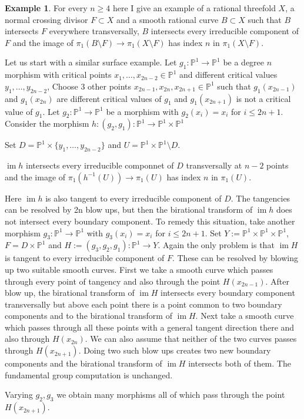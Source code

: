 \documentclass[12pt,twoside]{amsart}
\newcommand{\p}[0]{{\mathbb P}}
\newcommand{\im}[0]{\operatorname{im}}
\theoremstyle{definition}
\newtheorem{exmp}[thm]{Example}
\theoremstyle{remark}
\begin{document}
\begin{exmp} For every $n\geq 4$ here I give an example
 of a rational threefold $X$,
a normal crossing divisor $F\subset X$ and a smooth rational curve
$B\subset X$ such that $B$ intersects $F$ everywhere transversally,
$B$ intersects every irreducible component of $F$ and
the image of $\pi_1(B\setminus F)\to \pi_1(X\setminus F)$
has index $n$ in $\pi_1(X\setminus F)$.
 
Let us start with a similar surface example.
Let $g_1:\p^1\to \p^1$ be a degree $n$ morphism
with critical points $x_1,\dots,x_{2n-2}\in \p^1$ and different
 critical values $y_1,\dots,y_{2n-2}$,
 Choose 3 other points $x_{2n-1},x_{2n},x_{2n+1}\in \p^1$
 such that $g_1(x_{2n-1})$ and $g_1(x_{2n})$ are different critical
 values of $g_1$
 and $g_1(x_{2n+1})$ is not a critical value of $g_1$. 
 Let $g_2:\p^1\to \p^1$ be  a morphism with $g_2(x_i)=x_i$
 for  $i\leq 2n+1$.
 Consider the morphism $h:(g_2,g_1):\p^1\to \p^1\times \p^1$
 
Set $D=\p^1\times \{y_1,\dots,y_{2n-2}\}$ and
 $U=\p^1\times \p^1\setminus D$.

$\im h$ intersects every irreducible componnet of $D$ transversally 
at  $n-2$ points and the image of $\pi_1(h^{-1}(U))\to \pi_1(U)$
has index $n$ in $\pi_1(U)$. 

Here $\im h$ is also tangent to every irreducible component
of $D$. The tangencies can be resolved by 2n   blow ups,
but then the birational transform of $\im h$ does not intersect
every boundary component. To remedy this situation,
take another morphism
$g_3:\p^1\to \p^1$   with $g_3(x_i)=x_i$
 for  $i\leq 2n+1$.
Set $Y:=\p^1\times \p^1\times \p^1$, $F=D\times \p^1$ and
$H:=(g_3,g_2,g_1):\p^1\to Y$.
 Again the only problem is
that $\im H$ is tangent to every irreducible component
of $F$. These can be resolved by blowing up
 two suitable  smooth curves. 
First we take a smooth curve  
 which passes through
every point of tangency and also 
through the point $H(x_{2n-1})$.
After blow up, the birational transform of $\im H$
intersects every boundary component transversally but 
above each point there is a point common to two boundary components
and to the birational transform of $\im H$. 
Next take a smooth curve which passes through all these points
with a general tangent direction there and also through 
 $H(x_{2n})$. We can also assume that neither of the two curves
passes through $H(x_{2n+1})$. 
Doing two such blow ups creates two new boundary components and
the birational transform of $\im H$   intersects both of them.
The fundamental group computation is unchanged.

Varying $g_2,g_3$ we obtain many morphisms all of which pass through
the point $H(x_{2n+1})$. 
\end{exmp}
\end{document}
